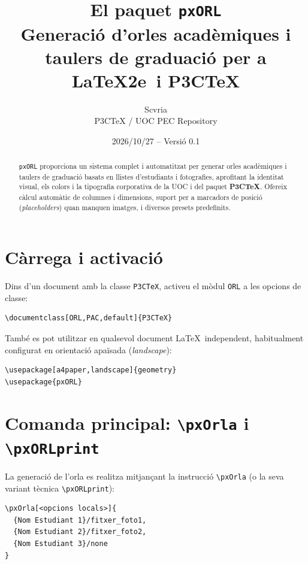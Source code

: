 \documentclass[11pt,a4paper]{article}
\title{El paquet \texttt{pxORL}\\
  \large Generaci\'o d'orles acad\`emiques i taulers de graduaci\'o per a \LaTeX2e\ i P3CTeX}
\author{Scvria\\P3CTeX / UOC PEC Repository}
\date{2026/10/27 -- Versi\'o 0.1}
\begin{document}
\maketitle

\begin{abstract}
  \texttt{pxORL} proporciona un sistema complet i automatitzat per generar orles acad\`emiques i
  taulers de graduaci\'o basats en llistes d'estudiants i fotografies, aprofitant la identitat visual,
  els colors i la tipografia corporativa de la UOC i del paquet \textbf{P3CTeX}. Ofereix c\`alcul
  autom\`atic de columnes i dimensions, suport per a marcadors de posici\'o (\emph{placeholders})
  quan manquen imatges, i diversos presets predefinits.
\end{abstract}

\tableofcontents
\newpage

\section{C\`arrega i activaci\'o}

Dins d'un document amb la classe \texttt{P3CTeX}, activeu el m\`odul \texttt{ORL} a les opcions de classe:

\begin{verbatim}
\documentclass[ORL,PAC,default]{P3CTeX}
\end{verbatim}

Tamb\'e es pot utilitzar en qualsevol document \LaTeX\ independent, habitualment configurat en orientaci\'o apa\"isada (\emph{landscape}):

\begin{verbatim}
\usepackage[a4paper,landscape]{geometry}
\usepackage{pxORL}
\end{verbatim}

\section{Comanda principal: \texttt{\textbackslash pxOrla} i \texttt{\textbackslash pxORLprint}}

La generaci\'o de l'orla es realitza mitjan\c{c}ant la instrucci\'o \texttt{\textbackslash pxOrla} (o la seva variant t\`ecnica \texttt{\textbackslash pxORLprint}):

\begin{verbatim}
\pxOrla[<opcions locals>]{
  {Nom Estudiant 1}/fitxer_foto1,
  {Nom Estudiant 2}/fitxer_foto2,
  {Nom Estudiant 3}/none
}
\end{verbatim}
\end{document}
